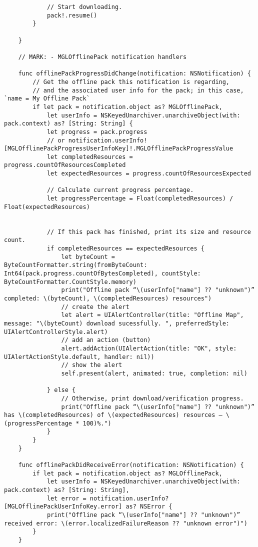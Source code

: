 \documentclass[letterpaper, 10pt,titlepage]{article}
\begin{document}
\begin{verbatim}
            // Start downloading.
            pack!.resume()
        }
        
    }
    
    // MARK: - MGLOfflinePack notification handlers
    
    func offlinePackProgressDidChange(notification: NSNotification) {
        // Get the offline pack this notification is regarding,
        // and the associated user info for the pack; in this case, `name = My Offline Pack`
        if let pack = notification.object as? MGLOfflinePack,
            let userInfo = NSKeyedUnarchiver.unarchiveObject(with: pack.context) as? [String: String] {
            let progress = pack.progress
            // or notification.userInfo![MGLOfflinePackProgressUserInfoKey]!.MGLOfflinePackProgressValue
            let completedResources = progress.countOfResourcesCompleted
            let expectedResources = progress.countOfResourcesExpected
            
            // Calculate current progress percentage.
            let progressPercentage = Float(completedResources) / Float(expectedResources)
            
            
            // If this pack has finished, print its size and resource count.
            if completedResources == expectedResources {
                let byteCount = ByteCountFormatter.string(fromByteCount: Int64(pack.progress.countOfBytesCompleted), countStyle: ByteCountFormatter.CountStyle.memory)
                print("Offline pack “\(userInfo["name"] ?? "unknown")” completed: \(byteCount), \(completedResources) resources")
                // create the alert
                let alert = UIAlertController(title: "Offline Map", message: "\(byteCount) download sucessfully. ", preferredStyle: UIAlertControllerStyle.alert)
                // add an action (button)
                alert.addAction(UIAlertAction(title: "OK", style: UIAlertActionStyle.default, handler: nil))
                // show the alert
                self.present(alert, animated: true, completion: nil)
                
            } else {
                // Otherwise, print download/verification progress.
                print("Offline pack “\(userInfo["name"] ?? "unknown")” has \(completedResources) of \(expectedResources) resources — \(progressPercentage * 100)%.")
            }
        }
    }
    
    func offlinePackDidReceiveError(notification: NSNotification) {
        if let pack = notification.object as? MGLOfflinePack,
            let userInfo = NSKeyedUnarchiver.unarchiveObject(with: pack.context) as? [String: String],
            let error = notification.userInfo?[MGLOfflinePackUserInfoKey.error] as? NSError {
            print("Offline pack “\(userInfo["name"] ?? "unknown")” received error: \(error.localizedFailureReason ?? "unknown error")")
        }
    }
    

\end{verbatim}
\end{document}
